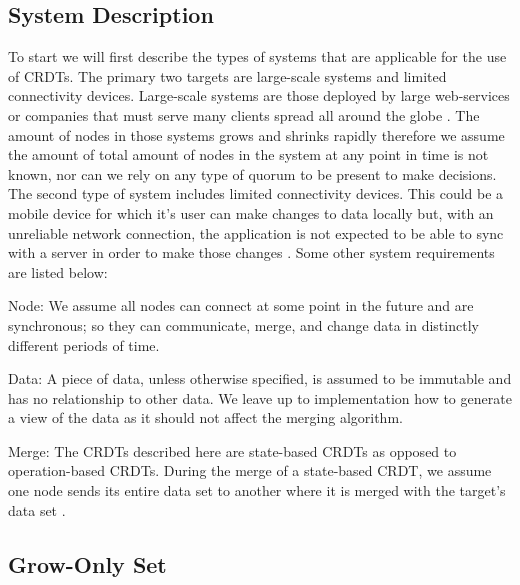 \documentclass{article}
\begin{document}
\begin{multicols}{2}
\begin{refsection}
\subsection*{System Description}

To start we will first describe the types of systems that are applicable for the use of CRDTs. The primary two targets are large-scale systems and limited connectivity devices. Large-scale systems are those deployed by large web-services or companies that must serve many clients spread all around the globe \cite{tao_merging_2015} \cite{balegas_making_2016}. The amount of nodes in those systems grows and shrinks rapidly therefore we assume the amount of total amount of nodes in the system at any point in time is not known, nor can we rely on any type of quorum to be present to make decisions. The second type of system includes limited connectivity devices. This could be a mobile device for which it's user can make changes to data locally but, with an unreliable network connection, the application is not expected to be able to sync with a server in order to make those changes \cite{perkins_simba:_2015}. Some other system requirements are listed below:

Node: We assume all nodes can connect at some point in the future and are synchronous; so they can communicate, merge, and change data in distinctly different periods of time.

Data: A piece of data, unless otherwise specified, is assumed to be immutable and has no relationship to other data. We leave up to implementation how to generate a view of the data as it should not affect the merging algorithm.

Merge: The CRDTs described here are state-based CRDTs as opposed to operation-based CRDTs. During the merge of a state-based CRDT, we assume one node sends its entire data set to another where it is merged with the target's data set \cite{shapiro_comprehensive_2011}.


\subsection*{Grow-Only Set}


\end{refsection}
\end{multicols}
\end{document}
